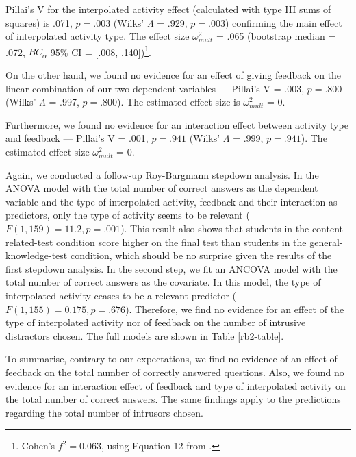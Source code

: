 Pillai's V for the interpolated activity effect (calculated with type
III sums of squares) is .071, \(p = .003\) (Wilks' \(\Lambda\) = .929,
\(p = .003\)) confirming the main effect of interpolated activity type.
The effect size \(\omega^2_{mult}\) = .065 (bootstrap median = .072,
\(BC_\alpha\) 95\% CI = {[}.008, .140{]})\footnote{
Cohen's \(f^2 = 0.063\), using Equation 12 from
\citet{steynjrEstimatingEffectSize2009}.
}.

On the other hand, we found no evidence for an effect of giving feedback
on the linear combination of our two dependent variables --- Pillai's V
= .003, \(p = .800\) (Wilks' \(\Lambda\) = .997, \(p = .800\)). The
estimated effect size is \(\omega^2_{mult}\) = 0.

Furthermore, we found no evidence for an interaction effect between
activity type and feedback --- Pillai's V = .001, \(p = .941\) (Wilks'
\(\Lambda\) = .999, \(p = .941\)). The estimated effect size
\(\omega^2_{mult}\) = 0.

Again, we conducted a follow-up Roy-Bargmann stepdown analysis. In the
ANOVA model with the total number of correct answers as the dependent
variable and the type of interpolated activity, feedback and their
interaction as predictors, only the type of activity seems to be
relevant (\(F(1, 159) = 11.2, p = .001\)). This result also shows that
students in the content-related-test condition score higher on the final
test than students in the general-knowledge-test condition, which should
be no surprise given the results of the first stepdown analysis. In the
second step, we fit an ANCOVA model with the total number of correct
answers as the covariate. In this model, the type of interpolated
activity ceases to be a relevant predictor
(\(F(1, 155) = 0.175, p = .676\)). Therefore, we find no evidence for an
effect of the type of interpolated activity nor of feedback on the
number of intrusive distractors chosen. The full models are shown in
Table \ref{rb2-table}.

To summarise, contrary to our expectations, we find no evidence of an
effect of feedback on the total number of correctly answered questions.
Also, we found no evidence for an interaction effect of feedback and
type of interpolated activity on the total number of correct answers.
The same findings apply to the predictions regarding the total number of
intrusors chosen.

